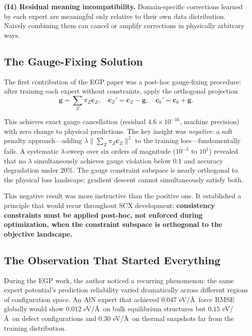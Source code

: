 \documentclass[12pt,a4paper]{ctexart}
\begin{document}
\textbf{(I4) Residual meaning incompatibility.} Domain-specific corrections learned by each expert are meaningful only relative to their own data distribution. Naively combining them can cancel or amplify corrections in physically arbitrary ways.

\subsection{The Gauge-Fixing Solution}

The first contribution of the EGP paper was a post-hoc gauge-fixing procedure: after training each expert without constraints, apply the orthogonal projection
\[
\mathbf{g} = \sum_Z \pi_Z \mathbf{c}_Z, \quad \mathbf{c}_Z' = \mathbf{c}_Z - \mathbf{g}, \quad \mathbf{c}_0' = \mathbf{c}_0 + \mathbf{g}.
\]

This achieves exact gauge cancellation (residual $4.6\times10^{-16}$, machine precision) with zero change to physical predictions. The key insight was \textit{negative}: a soft penalty approach—adding $\lambda\lVert\sum_Z\pi_Z\mathbf{c}_Z\rVert^2$ to the training loss—fundamentally fails. A systematic $\lambda$-sweep over six orders of magnitude ($10^{-3}$ to $10^1$) revealed that no $\lambda$ simultaneously achieves gauge violation below $0.1$ and accuracy degradation under $20\%$. The gauge constraint subspace is nearly orthogonal to the physical loss landscape; gradient descent cannot simultaneously satisfy both.

This negative result was more instructive than the positive one. It established a principle that would recur throughout SCX development: \textbf{consistency constraints must be applied post-hoc, not enforced during optimization, when the constraint subspace is orthogonal to the objective landscape.}

\subsection{The Observation That Started Everything}

During the EGP work, the author noticed a recurring phenomenon: the same expert potential's prediction reliability varied dramatically across different regions of configuration space. An AlN expert that achieved $0.047$ eV/\AA\ force RMSE globally would show $0.012$ eV/\AA\ on bulk equilibrium structures but $0.15$ eV/\AA\ on defect configurations and $0.30$ eV/\AA\ on thermal snapshots far from the training distribution.
\end{document}
